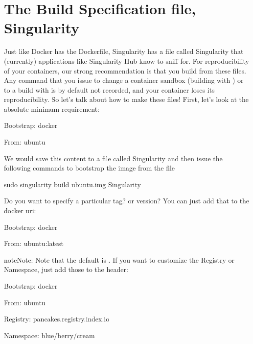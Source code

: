 \documentclass[letterpaper,10pt,english]{sphinxmanual}
\begin{document}
\section{The Build Specification file, Singularity}
\label{\detokenize{singularity_and_docker:the-build-specification-file-singularity}}
Just like Docker has the Dockerfile, Singularity has a file called
Singularity that (currently) applications like Singularity Hub know to
sniff for. For reproducibility of your containers, our strong
recommendation is that you build from these files. Any command that you
issue to change a container sandbox (building with  ) or to a build with 
is by default not recorded, and your container loses its
reproducibility. So let’s talk about how to make these files! First,
let’s look at the absolute minimum requirement:

%
\begin{sphinxVerbatim}[commandchars=\\\{\}]
Bootstrap: docker

From: ubuntu
\end{sphinxVerbatim}

We would save this content to a file called Singularity and then issue
the following commands to bootstrap the image from the file

%
\begin{sphinxVerbatim}[commandchars=\\\{\}]
sudo singularity build ubuntu.img Singularity
\end{sphinxVerbatim}

Do you want to specify a particular tag? or version? You can just add
that to the docker uri:

%
\begin{sphinxVerbatim}[commandchars=\\\{\}]
Bootstrap: docker

From: ubuntu:latest
\end{sphinxVerbatim}

\begin{sphinxadmonition}{note}{Note:}
Note that the default is  . If you want to customize the Registry or
Namespace, just add those to the header:
\end{sphinxadmonition}

%
\begin{sphinxVerbatim}[commandchars=\\\{\}]
Bootstrap: docker

From: ubuntu

Registry: pancakes.registry.index.io

Namespace: blue/berry/cream
\end{sphinxVerbatim}
\end{document}
